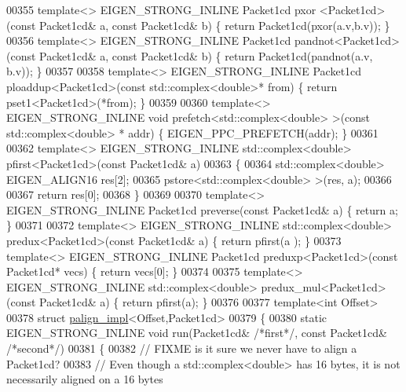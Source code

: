 \begin{DoxyCode}
00355 \textcolor{keyword}{template}<> EIGEN\_STRONG\_INLINE Packet1cd pxor   <Packet1cd>(\textcolor{keyword}{const} Packet1cd& a, \textcolor{keyword}{const} Packet1cd& b) \{ \textcolor{keywordflow}{
      return} Packet1cd(pxor(a.v,b.v)); \}
00356 \textcolor{keyword}{template}<> EIGEN\_STRONG\_INLINE Packet1cd pandnot<Packet1cd>(\textcolor{keyword}{const} Packet1cd& a, \textcolor{keyword}{const} Packet1cd& b) \{ \textcolor{keywordflow}{
      return} Packet1cd(pandnot(a.v, b.v)); \}
00357 
00358 \textcolor{keyword}{template}<> EIGEN\_STRONG\_INLINE Packet1cd ploaddup<Packet1cd>(\textcolor{keyword}{const} std::complex<double>*     from)  \{ \textcolor{keywordflow}{
      return} pset1<Packet1cd>(*from); \}
00359 
00360 \textcolor{keyword}{template}<> EIGEN\_STRONG\_INLINE \textcolor{keywordtype}{void} prefetch<std::complex<double> >(\textcolor{keyword}{const} std::complex<double> * addr)    \{
       EIGEN\_PPC\_PREFETCH(addr); \}
00361 
00362 \textcolor{keyword}{template}<> EIGEN\_STRONG\_INLINE std::complex<double>  pfirst<Packet1cd>(\textcolor{keyword}{const} Packet1cd& a)
00363 \{
00364   std::complex<double> EIGEN\_ALIGN16 res[2];
00365   pstore<std::complex<double> >(res, a);
00366 
00367   \textcolor{keywordflow}{return} res[0];
00368 \}
00369 
00370 \textcolor{keyword}{template}<> EIGEN\_STRONG\_INLINE Packet1cd preverse(\textcolor{keyword}{const} Packet1cd& a) \{ \textcolor{keywordflow}{return} a; \}
00371 
00372 \textcolor{keyword}{template}<> EIGEN\_STRONG\_INLINE std::complex<double> predux<Packet1cd>(\textcolor{keyword}{const} Packet1cd& a) \{ \textcolor{keywordflow}{return} pfirst(a
      ); \}
00373 \textcolor{keyword}{template}<> EIGEN\_STRONG\_INLINE Packet1cd preduxp<Packet1cd>(\textcolor{keyword}{const} Packet1cd* vecs)        \{ \textcolor{keywordflow}{return} vecs[0];
       \}
00374 
00375 \textcolor{keyword}{template}<> EIGEN\_STRONG\_INLINE std::complex<double> predux\_mul<Packet1cd>(\textcolor{keyword}{const} Packet1cd& a) \{ \textcolor{keywordflow}{return} 
      pfirst(a); \}
00376 
00377 \textcolor{keyword}{template}<\textcolor{keywordtype}{int} Offset>
00378 \textcolor{keyword}{struct }\hyperlink{struct_eigen_1_1internal_1_1palign__impl}{palign\_impl}<Offset,Packet1cd>
00379 \{
00380   \textcolor{keyword}{static} EIGEN\_STRONG\_INLINE \textcolor{keywordtype}{void} run(Packet1cd& \textcolor{comment}{/*first*/}, \textcolor{keyword}{const} Packet1cd& \textcolor{comment}{/*second*/})
00381   \{
00382     \textcolor{comment}{// FIXME is it sure we never have to align a Packet1cd?}
00383     \textcolor{comment}{// Even though a std::complex<double> has 16 bytes, it is not necessarily aligned on a 16 bytes
}
\end{DoxyCode}
